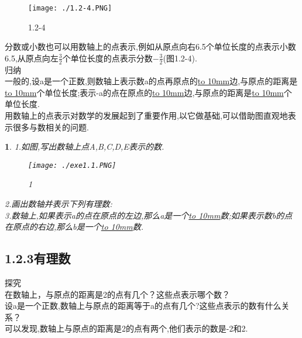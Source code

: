 \documentclass{article}
\newtheorem{exercise}{ }
\begin{document}
	\begin{figure}[ht!]
		\centering
		\texttt{[image: ./1.2-4.PNG]}
		\caption{1.2-4}
	\end{figure}
	\indent 分数或小数也可以用数轴上的点表示,例如从原点向右6.5个单位长度的点表示小数6.5,从原点向左$\frac{3}{2}$个单位长度的点表示分数$-\frac{3}{2}$(图1.2-4).\\
	
	归纳\\
	\indent 一般的,设a是一个正数,则数轴上表示数a的点再原点的\underline{\hbox to 10mm{}}边,与原点的距离是\underline{\hbox to 10mm{}}个单位长度;表示-a的点在原点的\underline{\hbox to 10mm{}}边,与原点的距离是\underline{\hbox to 10mm{}}个单位长度.\\
	\indent 用数轴上的点表示对数学的发展起到了重要作用,以它做基础,可以借助图直观地表示很多与数相关的问题.\\
	
	\begin{exercise}
		1.如图,写出数轴上点A,B,C,D,E表示的数.\\
		\begin{figure}[ht!]
			\centering
			\texttt{[image: ./exe1.1.PNG]}
			\caption{1}
		\end{figure}
		2.画出数轴并表示下列有理数:\\
		\indent
		3.数轴上,如果表示a的点在原点的左边,那么a是一个\underline{\hbox to 10mm{}}数;如果表示数b的点在原点的右边,那么b是一个\underline{\hbox to 10mm{}}数.\\
	\end{exercise}

	\subsection*{1.2.3有理数}
	探究\\
	\indent 在数轴上，与原点的距离是2的点有几个？这些点表示哪个数？\\
	设a是一个正数,数轴上与原点的距离等于a的点有几个?这些点表示的数有什么关系？\\
	\indent 可以发现,数轴上与原点的距离是2的点有两个,他们表示的数是-2和2.\\
	
\end{document}

